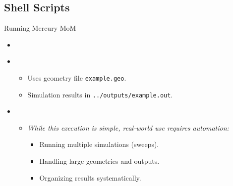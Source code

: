 % 

\subsection{Shell Scripts}

\begin{frame}{Running Mercury MoM}
\begin{itemize}
    \item {}
    \begin{center}
        \texttt{}
    \end{center}
    \vspace{0.5cm}

    \item {}
    \begin{itemize}
        \item {} Uses geometry file \texttt{example.geo}.
        \item {} Simulation results in \texttt{../outputs/example.out}.
    \end{itemize}

    \vspace{0.5cm}

    \item {}
    \begin{itemize}
        \item \textit{While this execution is simple, real-world use requires automation:}
        \begin{itemize}
            \item Running multiple simulations (sweeps).
            \item Handling large geometries and outputs.
            \item Organizing results systematically.
        \end{itemize}
    \end{itemize}
\end{itemize}
\end{frame}


